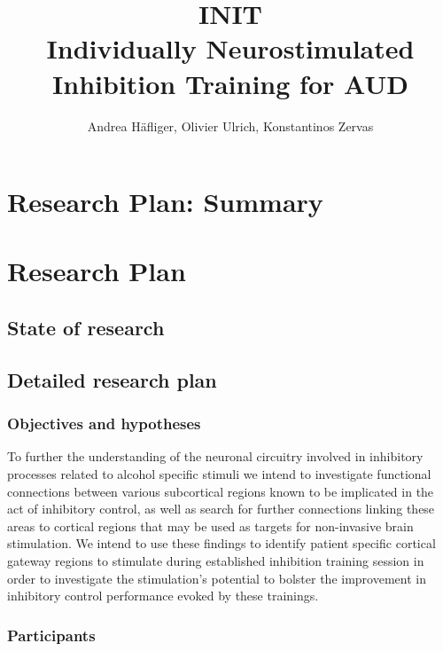 \documentclass[12pt]{article}
\title{%
	INIT \\
	\large Individually Neurostimulated Inhibition Training for AUD}
\author{Andrea Häfliger, Olivier Ulrich, Konstantinos Zervas}
\begin{document}
\pagestyle{fancy}
\thispagestyle{empty}

\maketitle
\newpage
\tableofcontents
\newpage

\section{Research Plan: Summary}

\lipsum[1-5]

\section{Research Plan}

\lipsum

\subsection{State of research}

\lipsum[1-3]

\subsection{Detailed research plan}

\lipsum[1-5]

\subsubsection{Objectives and hypotheses}

To further the understanding of the neuronal circuitry involved in inhibitory processes related to alcohol specific stimuli we intend to investigate functional connections between various subcortical regions known to be implicated in the act of inhibitory control, as well as search for further connections linking these areas to cortical regions that may be used as targets for non-invasive brain stimulation. We intend to use these findings to identify patient specific cortical gateway regions to stimulate during established inhibition training session in order to investigate the stimulation's potential to bolster the improvement in inhibitory control performance evoked by these trainings.

\subsubsection{Participants}
\end{document}
